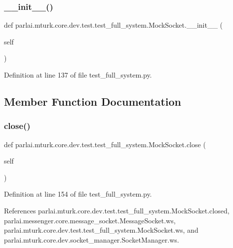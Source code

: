 \subsubsection{\texorpdfstring{\+\_\+\+\_\+init\+\_\+\+\_\+()}{\_\_init\_\_()}}
{\footnotesize\ttfamily def parlai.\+mturk.\+core.\+dev.\+test.\+test\+\_\+full\+\_\+system.\+Mock\+Socket.\+\_\+\+\_\+init\+\_\+\+\_\+ (\begin{DoxyParamCaption}\item[{}]{self }\end{DoxyParamCaption})}



Definition at line 137 of file test\+\_\+full\+\_\+system.\+py.



\subsection{Member Function Documentation}
\mbox{\label{classparlai_1_1mturk_1_1core_1_1dev_1_1test_1_1test__full__system_1_1MockSocket_af4078b6c90d1736d84a0c99aa6bc7bc0}} 
\subsubsection{\texorpdfstring{close()}{close()}}
{\footnotesize\ttfamily def parlai.\+mturk.\+core.\+dev.\+test.\+test\+\_\+full\+\_\+system.\+Mock\+Socket.\+close (\begin{DoxyParamCaption}\item[{}]{self }\end{DoxyParamCaption})}



Definition at line 154 of file test\+\_\+full\+\_\+system.\+py.



References parlai.\+mturk.\+core.\+dev.\+test.\+test\+\_\+full\+\_\+system.\+Mock\+Socket.\+closed, parlai.\+messenger.\+core.\+message\+\_\+socket.\+Message\+Socket.\+ws, parlai.\+mturk.\+core.\+dev.\+test.\+test\+\_\+full\+\_\+system.\+Mock\+Socket.\+ws, and parlai.\+mturk.\+core.\+dev.\+socket\+\_\+manager.\+Socket\+Manager.\+ws.

